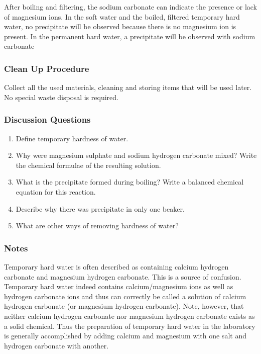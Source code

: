 {\begin{center}
\end{center}
After boiling and filtering, the sodium carbonate can indicate the presence or lack of magnesium ions. In the soft water and the boiled, filtered temporary hard water, no precipitate will be observed because there is no magnesium ion is present. In the permanent hard water, a precipitate will be observed with sodium carbonate


\subsubsection*{Clean Up Procedure}
Collect all the used materials, cleaning and storing items that will be used later. No special waste disposal is required.

\subsubsection*{Discussion Questions}
\begin{enumerate}
\item{Define temporary hardness of water.}
\item{Why were magnesium sulphate and sodium hydrogen carbonate mixed? Write the chemical formulae of the resulting solution.}
\item{What is the precipitate formed during boiling? Write a balanced chemical equation for this reaction.}
\item{Describe why there was precipitate in only one beaker.}
\item{What are other ways of removing hardness of water?}
\end{enumerate}

\subsubsection*{Notes}
Temporary hard water is often described as containing calcium hydrogen carbonate and magnesium hydrogen carbonate. This is a source of confusion. Temporary hard water indeed contains calcium/magnesium ions as well as hydrogen carbonate ions and thus can correctly be called a solution of calcium hydrogen carbonate (or magnesium hydrogen carbonate). Note, however, that neither calcium hydrogen carbonate nor magnesium hydrogen carbonate exists as a solid chemical. Thus the preparation of temporary hard water in the laboratory is generally accomplished by adding calcium and magnesium with one salt and hydrogen carbonate with another.

}
